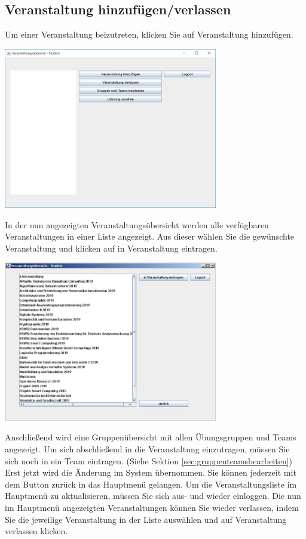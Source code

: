 \documentclass{Handbuch}
\begin{document}
\subsection{Veranstaltung hinzufügen/verlassen}
Um einer Veranstaltung beizutreten, klicken Sie auf \frqq Veranstaltung hinzufügen\flqq{}. 
\begin{center}
	\includegraphics[width=0.7\textwidth]{img_student1.jpg}
\end{center}
In der nun angezeigten Veranstaltungsübersicht werden alle verfügbaren Veranstaltungen in einer Liste angezeigt. Aus dieser wählen Sie die gewünschte Veranstaltung und klicken auf \frqq in Veranstaltung eintragen\flqq{}.
\begin{center}
	\includegraphics[width=0.7\textwidth]{img_student2.jpg}
\end{center}
Anschließend wird eine Gruppenübersicht mit allen Übungsgruppen und Teams angezeigt. Um sich abschließend in die Veranstaltung einzutragen, müssen Sie sich noch in ein Team eintragen. (Siehe Sektion \ref{sec:gruppenteamsbearbeiten})
Erst jetzt wird die Änderung im System übernommen.
Sie können jederzeit mit dem Button \frqq zurück\flqq{} in das Hauptmenü gelangen. Um die Veranstaltungsliste im Hauptmenü zu aktualisieren, müssen Sie sich aus- und wieder einloggen.
Die nun im Hauptmenü angezeigten Veranstaltungen können Sie wieder verlassen, indem Sie die jeweilige Veranstaltung in der Liste auswählen und auf \frqq Veranstaltung verlassen\flqq{} klicken. 
\end{document}
